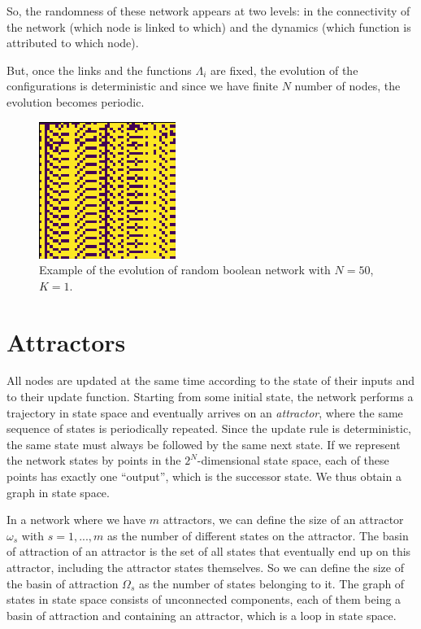 \documentclass[11pt]{article}
\begin{document}
So, the randomness of these network appears at two levels: in the connectivity of the network (which node is linked
to which) and the dynamics (which function is attributed to which node).

But, once the links and the functions $\Lambda_i$ are fixed, the evolution of the configurations is deterministic and since we have finite $N$ number of nodes, the evolution becomes periodic. 

\begin{figure}[ht!]
  \center
  \includegraphics[scale=0.5]{rbn.png}
 \caption{Example of the evolution of random boolean network with $N=50$, $K=1$.}
  \label{fig:net}
\end{figure}

\section{Attractors}
All nodes are updated at the same time
according to the state of their inputs and to their update
function. Starting from some initial state, the network
performs a trajectory in state space and eventually arrives on an \emph{attractor}, where the same sequence of states
is periodically repeated. Since the update rule is deterministic, the same state must always be followed by the
same next state. If we represent the network states by
points in the $2^N$-dimensional state space, each of these
points has exactly one “output”, which is the successor
state. We thus obtain a graph in state space.

 In a network where we have $m$ attractors,
we can define the size of an attractor $\omega_s$ with $s = 1,...,m$ as the number of different states on the attractor. The basin of attraction
of an attractor is the set of all states that eventually
end up on this attractor, including the attractor states
themselves.  So we can define the size of the basin of attraction $\Omega_s$ as the
number of states belonging to it. The graph of states
in state space consists of unconnected components, each
of them being a basin of attraction and containing an
attractor, which is a loop in state space. 
\end{document}
